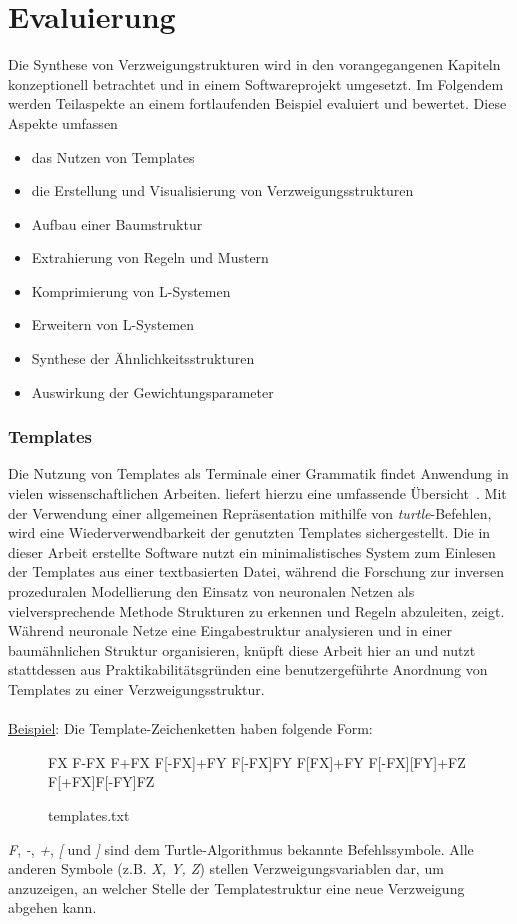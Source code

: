 
\chapter{Evaluierung}
Die Synthese von Verzweigungstrukturen wird in den vorangegangenen Kapiteln konzeptionell betrachtet
und in einem Softwareprojekt umgesetzt.
Im Folgendem werden Teilaspekte an einem fortlaufenden Beispiel evaluiert und bewertet.
Diese Aspekte umfassen
\begin{itemize}
    \item das Nutzen von Templates
    \item die Erstellung und Visualisierung von Verzweigungsstrukturen
    \item Aufbau einer Baumstruktur
    \item Extrahierung von Regeln und Mustern
    \item Komprimierung von L-Systemen
    \item Erweitern von L-Systemen
    \item Synthese der Ähnlichkeitsstrukturen
    \item Auswirkung der Gewichtungsparameter
\end{itemize}

\subsection*{Templates}
Die Nutzung von Templates als Terminale einer Grammatik findet Anwendung in vielen wissenschaftlichen Arbeiten.
\citeauthor{aliaga_2016} liefert hierzu eine umfassende Übersicht~\cite{aliaga_2016}.
Mit der Verwendung einer allgemeinen Repräsentation mithilfe von \textit{turtle}-Befehlen, wird eine
Wiederverwendbarkeit der genutzten Templates sichergestellt.
Die in dieser Arbeit erstellte Software nutzt ein minimalistisches System zum Einlesen der Templates aus
einer textbasierten Datei, während die Forschung zur inversen prozeduralen Modellierung den Einsatz von
neuronalen Netzen als vielversprechende Methode Strukturen zu erkennen und Regeln abzuleiten, zeigt.\\
Während neuronale Netze eine Eingabestruktur analysieren und in einer baumähnlichen Struktur organisieren,
knüpft diese Arbeit hier an und nutzt stattdessen aus Praktikabilitätsgründen eine benutzergeführte Anordnung
von Templates zu einer Verzweigungsstruktur.\\~\\
\underline{Beispiel}: Die Template-Zeichenketten haben folgende Form:
\begin{figure}[H]
    \centering
    \begin{csource}
FX
F-FX
F+FX
F[-FX]+FY
F[-FX]FY
F[FX]+FY
F[-FX][FY]+FZ
F[+FX]F[-FY]FZ
    \end{csource}
    \caption{templates.txt}
\end{figure}
\textit{F}, \textit{-}, \textit{+}, \textit{[} und \textit{]} sind dem Turtle-Algorithmus bekannte
Befehlssymbole.
Alle anderen Symbole (z.B. \textit{X, Y, Z}) stellen Verzweigungsvariablen dar, um anzuzeigen, an welcher Stelle
der Templatestruktur eine neue Verzweigung abgehen kann.

